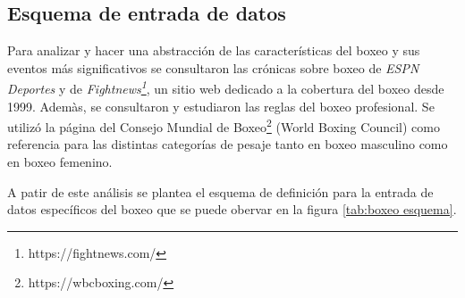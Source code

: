 \subsection{Esquema de entrada de datos}

Para analizar y hacer una abstracción de las características del boxeo y sus eventos más significativos se consultaron las crónicas sobre boxeo de 
\textit{ESPN Deportes} y de \textit{Fightnews\footnote[1]{https://fightnews.com/}}, un sitio web dedicado a la cobertura del boxeo desde 1999. 
Ademàs, se consultaron y estudiaron las reglas del boxeo profesional. Se utilizó la página del Consejo Mundial de 
Boxeo\footnote[2]{https://wbcboxing.com/} (World Boxing Council) como referencia para las distintas categorías de pesaje tanto en boxeo masculino como en 
boxeo femenino.

A patir de este análisis se plantea el esquema de definición para la entrada de datos específicos del boxeo que se puede obervar en la figura \ref{tab:boxeo esquema}. 

